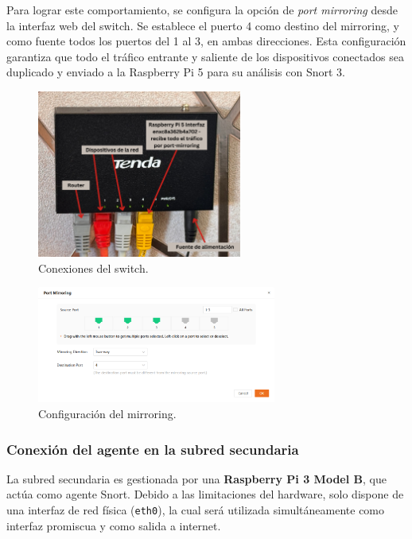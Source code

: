 \documentclass[11pt,a4paper,twoside]{report}
\begin{document}
Para lograr este comportamiento, se configura la opción de \textit{port mirroring} desde la interfaz web del switch. Se establece el puerto 4 como destino del mirroring, y como fuente todos los puertos del 1 al 3, en ambas direcciones. Esta configuración garantiza que todo el tráfico entrante y saliente de los dispositivos conectados sea duplicado y enviado a la Raspberry Pi 5 para su análisis con Snort 3.

\begin{figure}[H]
	\centering
	\includegraphics[width=0.6\textwidth]{install/0.2.png}
	\caption{Conexiones del switch.}
	\label{fig:switch-conexiones}
\end{figure}

\begin{figure}[H]
	\centering
	\includegraphics[width=0.70\textwidth]{install/9-asignacion_port.png}
	\caption{Configuración del mirroring.}
	\label{fig:switch-mirroring}
\end{figure}


\subsubsection{Conexión del agente en la subred secundaria}

La subred secundaria es gestionada por una \textbf{Raspberry Pi 3 Model B}, que actúa como agente Snort. Debido a las limitaciones del hardware, solo dispone de una interfaz de red física (\texttt{eth0}), la cual será utilizada simultáneamente como interfaz promiscua y como salida a internet.\newline
\end{document}
